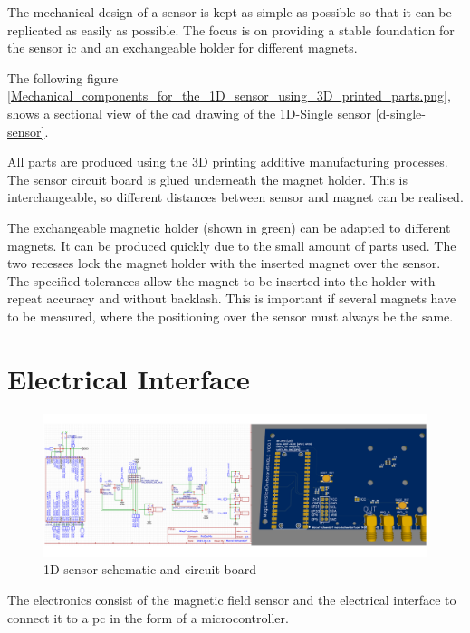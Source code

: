 The mechanical design of a sensor is kept as simple as possible so that
it can be replicated as easily as possible. The focus is on providing a
stable foundation for the sensor \gls{ic} and an exchangeable holder for
different magnets.

The following figure
\ref{Mechanical_components_for_the_1D_sensor_using_3D_printed_parts.png},
shows a sectional view of the \gls{cad} drawing of the 1D-Single sensor
\ref{d-single-sensor}.

All parts are produced using the 3D printing additive manufacturing
processes. The sensor circuit board is glued underneath the magnet
holder. This is interchangeable, so different distances between sensor
and magnet can be realised.

The exchangeable magnetic holder (shown in green) can be adapted to
different magnets. It can be produced quickly due to the small amount of
parts used. The two recesses lock the magnet holder with the inserted
magnet over the sensor. The specified tolerances allow the magnet to be
inserted into the holder with repeat accuracy and without backlash. This
is important if several magnets have to be measured, where the
positioning over the sensor must always be the same.

\hypertarget{electrical-interface}{%
\section{Electrical Interface}\label{electrical-interface}}

\begin{figure}
\centering
\includegraphics{./generated_images/border_1D_sensor_schematic_and_circuit_board.png}
\caption{1D sensor schematic and circuit board
\label{1D_sensor_schematic_and_circuit_board.png}}
\end{figure}

The electronics consist of the magnetic field sensor and the electrical
interface to connect it to a \gls{pc} in the form of a microcontroller.


